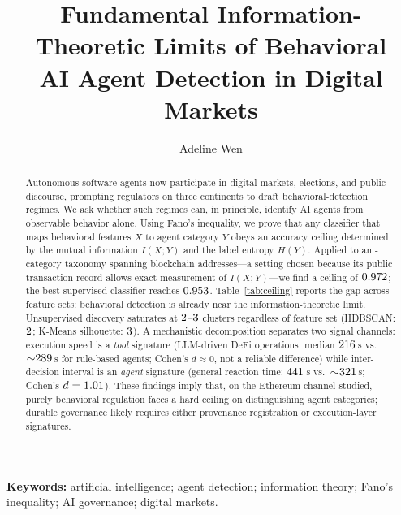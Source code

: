 \documentclass[11pt,a4paper]{article}
\title{Fundamental Information-Theoretic Limits of Behavioral\\ AI Agent Detection in Digital Markets}
\author[1]{Adeline Wen}
\affil[1]{Decentralized Computing Lab, University of Washington}
\date{}
\begin{document}
\maketitle

\begin{abstract}
\noindent
Autonomous software agents now participate in digital markets, elections, and
public discourse, prompting regulators on three continents to draft
behavioral-detection regimes. We ask whether such regimes can, in principle,
identify AI agents from observable behavior alone. Using Fano's inequality,
we prove that any classifier that maps behavioral features $X$ to agent
category $Y$ obeys an accuracy ceiling determined by the mutual information
$I(X;Y)$ and the label entropy $H(Y)$. Applied to an \nClasses-category taxonomy
spanning \nSamples{} blockchain addresses---a setting chosen because its public
transaction record allows exact measurement of $I(X;Y)$---we find a ceiling
of $0.972$; the best supervised classifier reaches $0.953$.
Table~\ref{tab:ceiling} reports the gap across feature sets: behavioral detection
is already near the information-theoretic limit. Unsupervised discovery saturates at
$2$--$3$ clusters regardless of feature set (HDBSCAN: $2$; K-Means silhouette:
$3$). A mechanistic decomposition separates two signal channels: execution
speed is a \emph{tool} signature (LLM-driven DeFi operations: median
$216$\,s vs.\ ${\sim}289$\,s for rule-based agents; Cohen's $d \approx 0$,
not a reliable difference) while inter-decision interval is an
\emph{agent} signature (general reaction time: $441$\,s vs.\ ${\sim}321$\,s;
Cohen's $d=1.01$). These findings imply that, on the Ethereum channel
studied, purely behavioral regulation faces a hard ceiling on
distinguishing agent categories; durable governance likely
requires either provenance registration or execution-layer signatures.
\end{abstract}

\vspace{0.5em}
\noindent\textbf{Keywords:} artificial intelligence; agent detection;
information theory; Fano's inequality; AI governance; digital markets.
\end{document}
